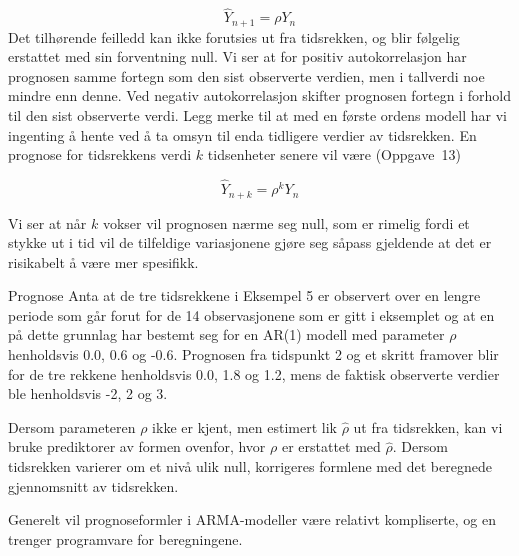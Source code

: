 \[   {\hat{Y}}_{n+1}=\rho Y_n      \]
Det tilhørende feilledd kan ikke forutsies ut fra tidsrekken, og
blir følgelig erstattet med sin forventning null.  Vi ser at for positiv
autokorrelasjon har prognosen samme fortegn som den sist observerte verdien,
men i tall\-verdi noe mindre enn denne.  Ved negativ autokorrelasjon skifter
prognosen fortegn i forhold til den sist observerte verdi.  Legg merke til at 
med en første ordens modell har vi ingenting å hente ved å ta 
omsyn til enda tidligere verdier av tidsrekken.  En prognose for tidsrekkens 
verdi $k$ tidsenheter senere vil være (Oppgave~13)

\[   {\hat{Y}}_{n+k}={\rho}^k Y_n    \]

\noindent Vi ser at når $k$ vokser vil prognosen nærme seg null, som
er rimelig fordi et stykke ut i tid vil de tilfeldige variasjonene gjøre
seg såpass gjeldende at det er risikabelt å være mer spesifikk.\\

\begin{eksempel}{Prognose}
Anta at de tre tidsrekkene i Eksempel 5 er observert over en lengre periode 
som går forut for de 14 observasjonene som er gitt i eksemplet og at
en på dette grunnlag har bestemt seg for en AR(1)
modell med parameter $\rho$ henholdsvis 0.0, 0.6 og -0.6.
Prognosen fra tidspunkt 2 og et skritt framover blir for de tre rekkene
henholdsvis 0.0, 1.8 og 1.2, mens de faktisk observerte verdier ble
henholdsvis -2, 2 og 3. 
\end{eksempel}

Dersom parameteren $\rho$ ikke er kjent, men  estimert lik $\hat{\rho}$ ut
fra tids\-rekken, kan vi bruke prediktorer av formen ovenfor, hvor $\rho$ er
erstattet med $\hat{\rho}$. Dersom tidsrekken varierer om et nivå ulik
null, korrigeres formlene med det beregnede gjennomsnitt av tids\-rekken.

Generelt vil prognoseformler i ARMA-modeller være relativt
kompli\-serte, og en trenger programvare for beregningene.\\

